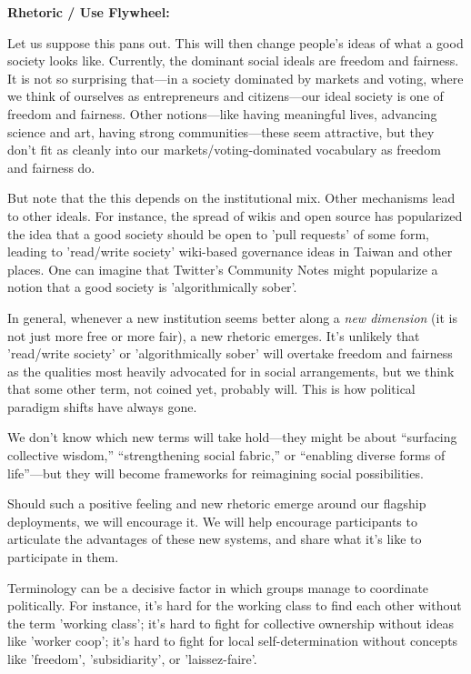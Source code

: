 \begin{small}
\textbf{Rhetoric / Use Flywheel:}

Let us suppose this pans out. This will then change people's ideas of what a good society looks like. Currently, the dominant social ideals are freedom and fairness. It is not so surprising that—in a society dominated by markets and voting, where we think of ourselves as entrepreneurs and citizens—our ideal society is one of freedom and fairness. Other notions—like having meaningful lives, advancing science and art, having strong communities—these seem attractive, but they don't fit as cleanly into our markets/voting-dominated vocabulary as freedom and fairness do.

But note that the this depends on the institutional mix. Other mechanisms lead to other ideals. For instance, the spread of wikis and open source has popularized the idea that a good society should be open to 'pull requests' of some form, leading to 'read/write society' wiki-based governance ideas in Taiwan and other places. One can imagine that Twitter's Community Notes might popularize a notion that a good society is 'algorithmically sober'.

In general, whenever a new institution seems better along a \textit{new dimension} (it is not just more free or more fair), a new rhetoric emerges. It's unlikely that 'read/write society' or 'algorithmically sober' will overtake freedom and fairness as the qualities most heavily advocated for in social arrangements, but we think that some other term, not coined yet, probably will. This is how political paradigm shifts have always gone.

We don't know which new terms will take hold—they might be about ``surfacing collective wisdom,'' ``strengthening social fabric,'' or ``enabling diverse forms of life''—but they will become frameworks for reimagining social possibilities.

Should such a positive feeling and new rhetoric emerge around our flagship deployments, we will encourage it. We will help encourage participants to articulate the advantages of these new systems, and share what it's like to participate in them.

Terminology can be a decisive factor in which groups manage to coordinate politically. For instance, it's hard for the working class to find each other without the term 'working class'; it's hard to fight for collective ownership without ideas like 'worker coop'; it's hard to fight for local self-determination without concepts like 'freedom', 'subsidiarity', or 'laissez-faire'.


\end{small}

